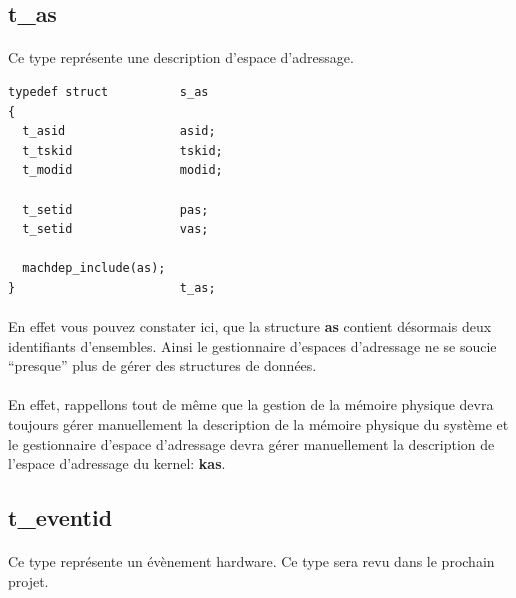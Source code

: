 \documentclass[10pt,a4wide]{article}
\begin{document}
\subsection{t\_as}

\paragraph{}

Ce type repr\'esente une description d'espace d'adressage.

\begin{verbatim}
typedef struct          s_as
{
  t_asid                asid;
  t_tskid               tskid;
  t_modid               modid;

  t_setid               pas;
  t_setid               vas;

  machdep_include(as);
}                       t_as;
\end{verbatim}

\paragraph{}

En effet vous pouvez constater ici, que la structure \textbf{as} contient
d\'esormais deux identifiants d'ensembles. Ainsi le gestionnaire d'espaces
d'adressage ne se soucie ``presque'' plus de g\'erer des structures de
donn\'ees.

\paragraph{}

En effet, rappellons tout de m\^eme que la gestion de la m\'emoire physique
devra toujours g\'erer manuellement la description de la m\'emoire physique
du syst\`eme et le gestionnaire d'espace d'adressage devra g\'erer
manuellement la description de l'espace d'adressage du kernel: \textbf{kas}.

\subsection{t\_eventid}

\paragraph{}

Ce type repr\'esente un \'ev\`enement hardware. Ce type sera revu dans
le prochain projet.
\end{document}
